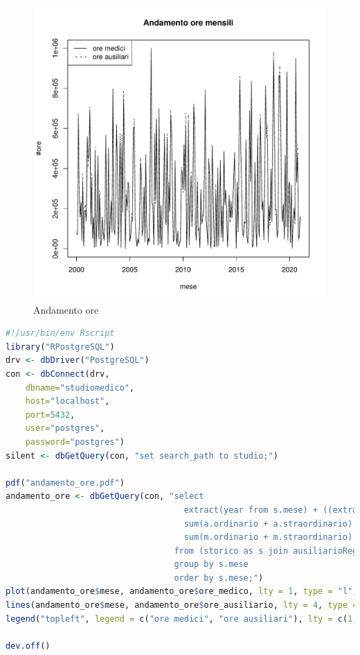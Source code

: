 \documentclass[11pt]{article}
\begin{document}
\begin{figure}[H]
    \includegraphics[width=\linewidth]{andamento_ore.pdf}
    \caption{Andamento ore}
    \label{fig:andamento_ore}
\end{figure}
\begin{lstlisting}[language=R]
#!/usr/bin/env Rscript
library("RPostgreSQL")
drv <- dbDriver("PostgreSQL")
con <- dbConnect(drv,
	dbname="studiomedico",
	host="localhost",
	port=5432,
	user="postgres",
	password="postgres")
silent <- dbGetQuery(con, "set search_path to studio;")

pdf("andamento_ore.pdf")
andamento_ore <- dbGetQuery(con, "select
                                    extract(year from s.mese) + ((extract(month from s.mese) - 1) / 12) mese,
                                    sum(a.ordinario + a.straordinario) ore_ausiliario,
                                    sum(m.ordinario + m.straordinario) ore_medico
                                  from (storico as s join ausiliarioRegistra as a on s.mese = a.mese) join medicoRegistra as m  on s.mese = m.mese
                                  group by s.mese
                                  order by s.mese;")
plot(andamento_ore$mese, andamento_ore$ore_medico, lty = 1, type = "l", main = "Andamento ore mensili")
lines(andamento_ore$mese, andamento_ore$ore_ausiliario, lty = 4, type = "l")
legend("topleft", legend = c("ore medici", "ore ausiliari"), lty = c(1, 4))

dev.off()
\end{lstlisting}
\end{document}
